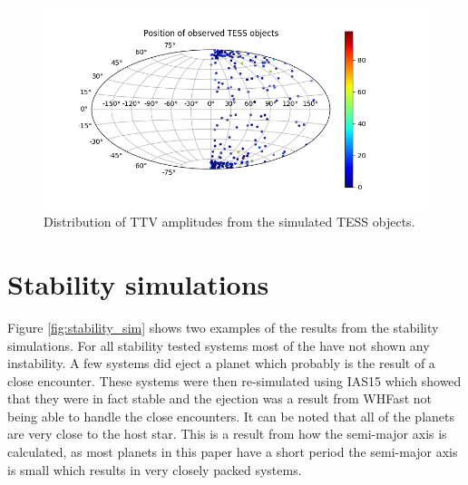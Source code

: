\documentclass[12pt]{report}
\begin{document}
\begin{figure}[h!]
 	 \centering
	  \includegraphics[width=\textwidth]{img/skymap_TESS_wrap_cutoff.png}
	  \caption{Distribution of TTV amplitudes from the simulated TESS objects.}
	 \label{fig:skymap_amp}
\end{figure}
\section{Stability simulations}
	Figure \ref{fig:stability_sim} shows two examples of the results from the stability simulations. For all stability tested systems most of the have not shown any instability. A few systems did eject a planet which  probably is the result of a close encounter. These systems were then re-simulated using IAS15 which showed that they were in fact stable and the ejection was a result from WHFast not being able to handle the close encounters. It can be noted that all of the planets are very close to the host star. This is a result from how the semi-major axis is calculated, as most planets in this paper have a short period the semi-major axis is small which results in very closely packed systems.
\end{document}

